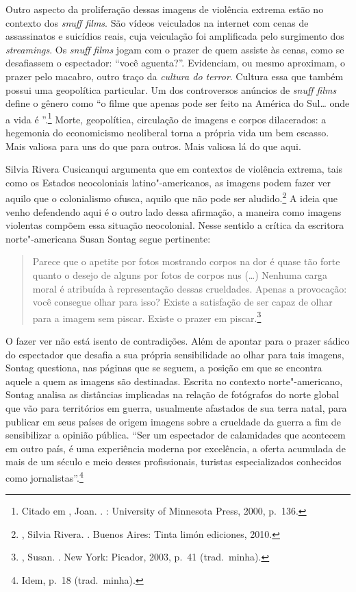 Outro aspecto da proliferação dessas imagens de violência extrema estão no
contexto dos \emph{snuff films}. São vídeos veiculados na internet com
cenas de assassinatos e suicídios reais, cuja veiculação foi amplificada
pelo surgimento dos \emph{streamings}. Os \emph{snuff films} jogam com o
prazer de quem assiste às cenas, como se desafiassem o espectador: ``você
aguenta?''. Evidenciam, ou mesmo aproximam, o prazer pelo macabro, outro
traço da \emph{cultura do terror}. Cultura essa que também possui uma
geopolítica particular. Um dos controversos anúncios de \emph{snuff
films} define o gênero como ``o filme que apenas pode ser feito na
América do Sul\ldots{} onde a vida é ''.\footnote{Citado em , Joan. {}. : University of Minnesota Press, 2000, p.~136.} Morte,
geopolítica, circulação de imagens e corpos dilacerados: a hegemonia do
economicismo neoliberal torna a própria vida um bem escasso. Mais
valiosa para uns do que para outros. Mais valiosa lá do que aqui.

\asterisc

Silvia Rivera Cusicanqui argumenta que em contextos de violência extrema,
tais como os Estados neocoloniais latino"-americanos, as imagens podem fazer
ver aquilo que o colonialismo ofusca, aquilo que não pode ser
aludido.\footnote{, Silvia Rivera. {}. Buenos Aires: Tinta limón
  ediciones, 2010.} A ideia que venho defendendo aqui é o outro lado
dessa afirmação, a maneira como imagens violentas compõem essa situação
neocolonial. Nesse sentido a crítica da escritora norte"-americana Susan
Sontag segue pertinente:

\begin{quote}
Parece que o apetite por fotos mostrando corpos na dor é quase tão forte quanto o desejo de alguns por fotos de corpos nus (\ldots{}) Nenhuma carga moral é atribuída à
representação dessas crueldades. Apenas a provocação: você consegue olhar para isso? Existe a satisfação de ser capaz de olhar para a imagem sem piscar. Existe o prazer em piscar.\footnote{, Susan. {}. New York: Picador, 2003, p.~41 (trad.~minha).}
\end{quote}

O fazer ver não está isento de contradições. Além de apontar para o
prazer sádico do espectador que desafia a sua própria sensibilidade ao
olhar para tais imagens, Sontag questiona, nas páginas que se seguem, a
posição em que se encontra aquele a quem as imagens são
destinadas. Escrita no contexto norte"-americano, Sontag analisa as
distâncias implicadas na relação de fotógrafos do norte global que vão
para territórios em guerra, usualmente afastados de sua terra natal,
para publicar em seus países de origem imagens sobre a crueldade da
guerra a fim de sensibilizar a opinião pública. ``Ser um espectador de calamidades que acontecem em outro país, é uma experiência moderna por excelência, a oferta acumulada de mais de um século e meio desses profissionais, turistas especializados conhecidos como jornalistas''.\footnote{Idem, p.~18 (trad.~minha).}

